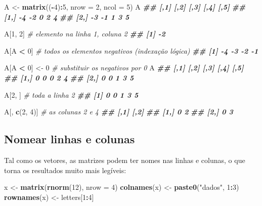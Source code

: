 \documentclass[
  portuguese,
  11pt,
  openany]{book}
\newenvironment{Shaded}{\begin{snugshade}}{\end{snugshade}}
\newcommand{\AttributeTok}[1]{\textcolor[rgb]{0.13,0.29,0.53}{#1}}
\newcommand{\CommentTok}[1]{\textcolor[rgb]{0.56,0.35,0.01}{\textit{#1}}}
\newcommand{\DecValTok}[1]{\textcolor[rgb]{0.00,0.00,0.81}{#1}}
\newcommand{\DocumentationTok}[1]{\textcolor[rgb]{0.56,0.35,0.01}{\textbf{\textit{#1}}}}
\newcommand{\FunctionTok}[1]{\textcolor[rgb]{0.13,0.29,0.53}{\textbf{#1}}}
\newcommand{\NormalTok}[1]{#1}
\newcommand{\OtherTok}[1]{\textcolor[rgb]{0.56,0.35,0.01}{#1}}
\newcommand{\SpecialCharTok}[1]{\textcolor[rgb]{0.81,0.36,0.00}{\textbf{#1}}}
\newcommand{\StringTok}[1]{\textcolor[rgb]{0.31,0.60,0.02}{#1}}
\begin{document}
\begin{Shaded}
\begin{Highlighting}[]
\NormalTok{A }\OtherTok{\textless{}{-}} \FunctionTok{matrix}\NormalTok{((}\SpecialCharTok{{-}}\DecValTok{4}\NormalTok{)}\SpecialCharTok{:}\DecValTok{5}\NormalTok{, }\AttributeTok{nrow =} \DecValTok{2}\NormalTok{, }\AttributeTok{ncol =} \DecValTok{5}\NormalTok{)}
\NormalTok{A}
\DocumentationTok{\#\#      [,1] [,2] [,3] [,4] [,5]}
\DocumentationTok{\#\# [1,]   {-}4   {-}2    0    2    4}
\DocumentationTok{\#\# [2,]   {-}3   {-}1    1    3    5}

\NormalTok{A[}\DecValTok{1}\NormalTok{, }\DecValTok{2}\NormalTok{]      }\CommentTok{\# elemento na linha 1, coluna 2}
\DocumentationTok{\#\# [1] {-}2}

\NormalTok{A[A }\SpecialCharTok{\textless{}} \DecValTok{0}\NormalTok{]     }\CommentTok{\# todos os elementos negativos (indexação lógica)}
\DocumentationTok{\#\# [1] {-}4 {-}3 {-}2 {-}1}

\NormalTok{A[A }\SpecialCharTok{\textless{}} \DecValTok{0}\NormalTok{] }\OtherTok{\textless{}{-}} \DecValTok{0}    \CommentTok{\# substituir os negativos por 0}
\NormalTok{A}
\DocumentationTok{\#\#      [,1] [,2] [,3] [,4] [,5]}
\DocumentationTok{\#\# [1,]    0    0    0    2    4}
\DocumentationTok{\#\# [2,]    0    0    1    3    5}

\NormalTok{A[}\DecValTok{2}\NormalTok{, ]       }\CommentTok{\# toda a linha 2}
\DocumentationTok{\#\# [1] 0 0 1 3 5}

\NormalTok{A[, }\FunctionTok{c}\NormalTok{(}\DecValTok{2}\NormalTok{, }\DecValTok{4}\NormalTok{)] }\CommentTok{\# as colunas 2 e 4}
\DocumentationTok{\#\#      [,1] [,2]}
\DocumentationTok{\#\# [1,]    0    2}
\DocumentationTok{\#\# [2,]    0    3}
\end{Highlighting}
\end{Shaded}

\subsection{Nomear linhas e colunas}\label{nomear-linhas-e-colunas}

Tal como os vetores, as matrizes podem ter nomes nas linhas e colunas, o que
torna os resultados muito mais legíveis:

\begin{Shaded}
\begin{Highlighting}[]
\NormalTok{x }\OtherTok{\textless{}{-}} \FunctionTok{matrix}\NormalTok{(}\FunctionTok{rnorm}\NormalTok{(}\DecValTok{12}\NormalTok{), }\AttributeTok{nrow =} \DecValTok{4}\NormalTok{)}
\FunctionTok{colnames}\NormalTok{(x) }\OtherTok{\textless{}{-}} \FunctionTok{paste0}\NormalTok{(}\StringTok{"dados"}\NormalTok{, }\DecValTok{1}\SpecialCharTok{:}\DecValTok{3}\NormalTok{)}
\FunctionTok{rownames}\NormalTok{(x) }\OtherTok{\textless{}{-}}\NormalTok{ letters[}\DecValTok{1}\SpecialCharTok{:}\DecValTok{4}\NormalTok{]}
\end{Highlighting}
\end{Shaded}
\end{document}
